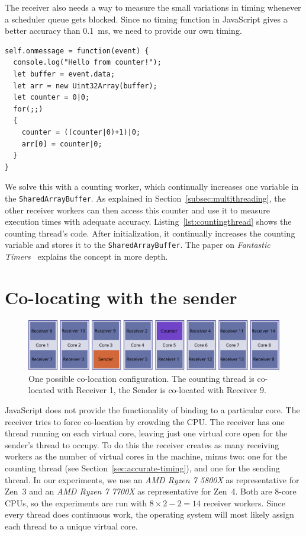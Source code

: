 \documentclass[11pt,
  titlepage=false,
  parskip=half,      %
]{scrreprt}
\begin{document}
The receiver also needs a way to measure the small variations in timing whenever a scheduler queue gets blocked.
Since no timing function in JavaScript gives a better accuracy than 0.1~ms, we need to provide our own timing.


\begin{lstlisting}[float,caption={The code for the counting thread},label={lst:countingthread}]
self.onmessage = function(event) {
  console.log("Hello from counter!");
  let buffer = event.data;
  let arr = new Uint32Array(buffer);
  let counter = 0|0;
  for(;;)
  {
    counter = ((counter|0)+1)|0;
    arr[0] = counter|0;
  }
}
\end{lstlisting}

We solve this with a counting worker, which continually increases one variable in the \texttt{SharedArrayBuffer}.
As explained in Section~\ref{subsec:multithreading}, the other receiver workers can then access this counter and use it to measure execution times with adequate accuracy.
Listing~\ref{lst:countingthread} shows the counting thread's code.
After initialization, it continually increases the counting variable and stores it to the \texttt{SharedArrayBuffer}.
The paper on \textit{Fantastic Timers}~\cite{Schwarz2017Timers} explains the concept in more depth.

\section{Co-locating with the sender}
\label{sec:co-location}

\begin{figure}
\centering
\includegraphics[width=\textwidth]{figures/colocation}

\caption{One possible co-location configuration. The counting thread is co-located with Receiver 1, the Sender is co-located with Receiver 9.}
\label{fig:colocation}

\end{figure}

JavaScript does not provide the functionality of binding to a particular core.
The receiver tries to force co-location by crowding the CPU.
The receiver has one thread running on each virtual core,
leaving just one virtual core open for the sender's thread to occupy.
To do this the receiver creates as many receiving workers as the number of virtual cores in the machine, minus two:
one for the counting thread (see Section~\ref{sec:accurate-timing}), and one for the sending thread.
In our experiments, we use an \textit{AMD Ryzen 7 5800X} as representative for Zen~3 and an \textit{AMD Ryzen 7 7700X} as representative for Zen~4.
Both are 8-core CPUs, so the experiments are run with $8 \times 2 - 2 = 14$ receiver workers.
Since every thread does continuous work, the operating system will most likely assign each thread to a unique virtual core.
\end{document}
